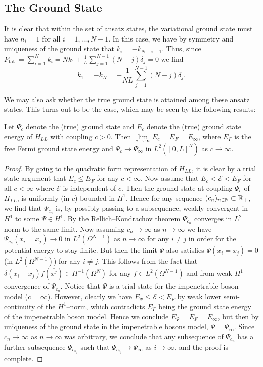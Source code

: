 	\subsection{The Ground State}
	It is clear that within the set of ansatz states, the variational ground state must have $ n_i=1 $ for all $ i=1,\ldots, N-1 $. In this case, we have by symmetry and uniqueness of the ground state that $ k_i=-k_{N-i+1} $. Thus, since $ P_{\text{tot.}}=\sum_{i=1}^{N}k_i=Nk_1+\frac{1}{L}\sum_{j=1}^{N-1}(N-j)\delta_j=0 $ we find $$ k_1=-k_N=-\frac{1}{NL}\sum_{j=1}^{N-1}(N-j)\delta_j.$$
	
	We may also ask whether the true ground state is attained among these ansatz states. This turns out to be the case, which may be seen by the following results:
	\begin{lemma}\label{LemmaLLTrueGroundState}
		Let $ \Psi_c $ denote the (true) ground state and $ E_c $ denote the (true) ground state energy of $ H_{LL} $ with coupling $ c>0 $. Then $ \lim\limits_{c\to\infty}E_c=E_F=E_\infty $, where $ E_F $ is the free Fermi ground state energy and $ \Psi_c\to \Psi_{\infty} $ in $ L^2([0,L]^N) $ as $ c \to\infty $.
	\end{lemma}
	\begin{proof}
		By going to the quadratic form representation of $ H_{LL} $, it is clear by a trial state argument that $ E_c\leq E_F $ for any $ c<\infty $. Now assume that $ E_c<\mathcal{E}<E_F $ for all $ c<\infty $ where $ \mathcal{E} $ is independent of $ c $. Then the ground state at coupling $ \Psi_c $ of $ H_{LL} $, is uniformly (in $ c $) bounded in $ H^1 $. Hence for any sequence $ (c_n)_{n\in\mathbb{N}}\subset\mathbb{R}_+ $, we find that $ \Psi_{c_n} $ is, by possibly passing to a subsequence, weakly convergent in $ H^1 $ to some $ \Psi\in H^1 $. By the Rellich--Kondrachov theorem $ \Psi_{c_n} $ converges in $ L^2 $ norm to the same limit. Now assuming $ c_n\to\infty $ as $ n\to\infty $ we have $ \Psi_{c_n}(x_i=x_j)\to 0 $ in $ L^2(\Omega^{N-1}) $ as $ n\to\infty $ for any $ i\neq j $ in order for the potential energy to stay finite. But then the limit $ \Psi $ also satisfies $ \Psi(x_i=x_j)=0 $ (in $ L^2(\Omega^{N-1}) $) for any $ i\neq j $. This follows from the fact that $ \delta(x_i-x_j)f(\overline{x^j})\in H^{-1}(\Omega^{N}) $ for any $ f\in L^2(\Omega^{N-1}) $ and from weak $ H^1 $ convergence of $ \Psi_{c_n} $. Notice that $ \Psi $ is a trial state for the impenetrable boson model ($ c=\infty $). However, clearly we have $ E_\Psi\leq \mathcal{E}<E_F $ by weak lower semi-continuity of the $ H^1 $--norm, which contradicts $ E_F $ being the ground state energy of the impenetrable boson model. Hence we conclude $ E_\Psi=E_F=E_\infty $, but then by uniqueness of the ground state in the impenetrable bosons model, $ \Psi=\Psi_\infty $. Since $ c_n\to \infty $ as $ n\to\infty $ was arbitrary, we conclude that any subsequence of $ \Psi_{c_n} $ has a further subsequence $ \Psi_{c_{n_i}} $ such that $ \Psi_{c_{n_i}}\to\Psi_\infty $ as $ i\to\infty $, and the proof is complete. 
	\end{proof}
